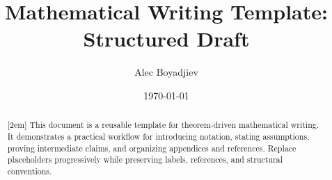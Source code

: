 \documentclass[twoside]{article}
\title{Mathematical Writing Template: Structured Draft}
\author{Alec Boyadjiev}
\date{\today}
\begin{document}
\maketitle

\begin{abstract}[2em]
This document is a reusable template for theorem-driven mathematical writing. It demonstrates a practical workflow for introducing notation, stating assumptions, proving intermediate claims, and organizing appendices and references. Replace placeholders progressively while preserving labels, references, and structural conventions.
\end{abstract}

\showlocalreferences %

\tableofcontents




\printbibliography
\end{document}
